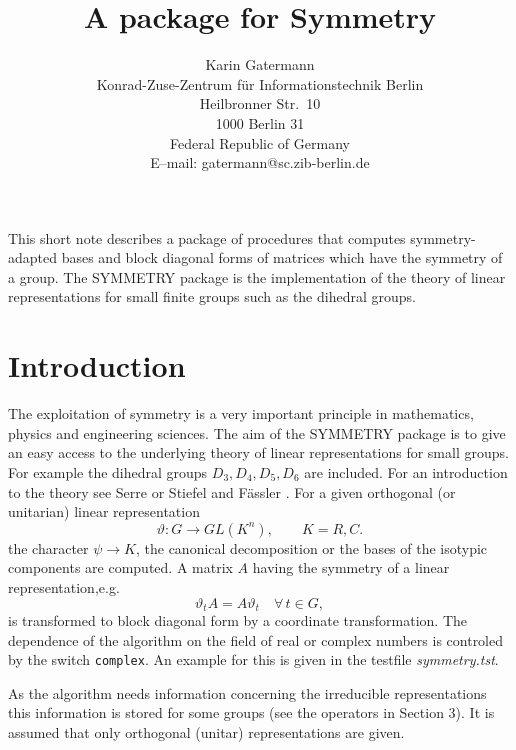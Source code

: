 \title{A \REDUCE{} package for Symmetry}
\date{}
\author{Karin Gatermann\\
        Konrad-Zuse-Zentrum f\"ur Informationstechnik Berlin\\
        Heilbronner Str.\ 10\\
        1000 Berlin 31\\
        Federal Republic of Germany\\
        E--mail: gatermann@sc.zib-berlin.de}

\maketitle
{}

This short note describes a package of \REDUCE{} procedures
that computes symmetry-adapted bases and block diagonal forms
of matrices which have the symmetry of a group.
The SYMMETRY package is the implementation 
of the theory of linear representations
for small finite groups such as the dihedral groups.

\section{Introduction}

The exploitation of symmetry is a very important principle in mathematics,
physics and engineering sciences.
The aim of the SYMMETRY package is to give an easy access to the 
underlying theory of linear representations for small groups. For
example the 
dihedral groups $D_3,D_4,D_5,D_6$ are included.
For an introduction to the theory see {\sc Serre} \cite{Se77} or
{\sc Stiefel} and {\sc F\"assler} \cite{StFae79}.
For a given orthogonal (or unitarian) linear representation 
\[
\vartheta : G\longrightarrow GL(K^n), \qquad K=R,C.
\]
the character $\psi\rightarrow K$, the 
canonical decomposition or the bases of the isotypic
components are computed. A matrix $A$ having the symmetry of a linear
representation,e.g.
\[
\vartheta_t A = A \vartheta_t \quad \forall \, t\in G,
\]
is transformed to block diagonal form by a coordinate
transformation. 
The dependence of the algorithm on the 
field of real or complex numbers is controled by the switch {\tt complex}.
An example for this is given in the testfile {\em symmetry.tst}.

As the algorithm needs information concerning the irreducible representations
this information is stored for some groups (see the operators in Section 3).
It is assumed that only orthogonal (unitar) representations are given.

